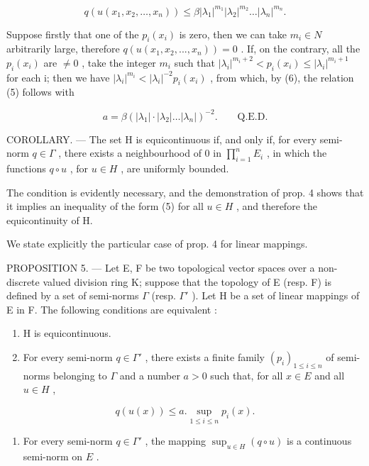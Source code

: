 \[
q \left(u \left(x _ {1}, x _ {2}, \dots , x _ {n}\right)\right) \leqslant \beta \left| \lambda_ {1} \right| ^ {m _ {1}} \left| \lambda_ {2} \right| ^ {m _ {2}} \dots \left| \lambda_ {n} \right| ^ {m _ {n}}.\tag{6}
\]

Suppose firstly that one of the \(p_{i}(x_{i})\) is zero, then we can take \(m_{i} \in N\) arbitrarily large, therefore \(q(u(x_{1}, x_{2}, ..., x_{n})) = 0\) . If, on the contrary, all the \(p_{i}(x_{i})\) are \(\neq 0\) , take the integer \(m_{i}\) such that \(|\lambda_{i}|^{m_{i}+2} < p_{i}(x_{i}) \leqslant |\lambda_{i}|^{m_{i}+1}\) for each i; then we have \(|\lambda_{i}|^{m_{i}} < |\lambda_{i}|^{-2}p_{i}(x_{i})\) , from which, by (6), the relation (5) follows with

\[
a = \beta (| \lambda_ {1} | \cdot | \lambda_ {2} | \dots | \lambda_ {n} |) ^ {- 2}. \qquad \text{Q.E.D.}
\]

COROLLARY. --- The set H is equicontinuous if, and only if, for every semi-norm \(q \in \Gamma\) , there exists a neighbourhood of 0 in \(\prod_{i=1}^{n} E_{i}\) , in which the functions \(q \circ u\) , for \(u \in H\) , are uniformly bounded.

The condition is evidently necessary, and the demonstration of prop. 4 shows that it implies an inequality of the form (5) for all \(u \in H\) , and therefore the equicontinuity of H.

We state explicitly the particular case of prop. 4 for linear mappings.

PROPOSITION 5. --- Let E, F be two topological vector spaces over a non-discrete valued division ring K; suppose that the topology of E (resp. F) is defined by a set of semi-norms \(\Gamma\) (resp. \(\Gamma'\) ). Let H be a set of linear mappings of E in F. The following conditions are equivalent :

\begin{enumerate}
\def\labelenumi{\alph{enumi})}
\item
  H is equicontinuous.
\item
  For every semi-norm \(q \in \Gamma'\) , there exists a finite family \((p_i)_{1 \leq i \leq n}\) of semi-norms belonging to \(\Gamma\) and a number \(a > 0\) such that, for all \(x \in E\) and all \(u \in H\) ,
\end{enumerate}

\[
q (u (x)) \leqslant a. \sup _ {1 \leqslant i \leqslant n} p _ {i} (x).\tag{7}
\]

\begin{enumerate}
\def\labelenumi{\alph{enumi})}
\setcounter{enumi}{2}
\tightlist
\item
  For every semi-norm \(q \in \Gamma'\) , the mapping \(\sup_{u \in H} (q \circ u)\) is a continuous semi-norm on \(E\) .
\end{enumerate}

